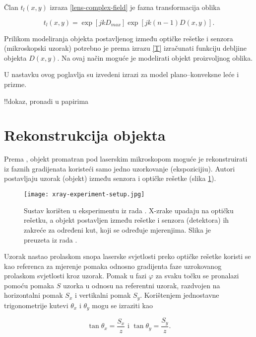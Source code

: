 \documentclass[times, utf8, diplomski, numeric]{fer}
\begin{document}
Član $t_l(x,y)$ izraza \ref{lens-complex-field} je fazna transformacija oblika

\begin{equation}
	\label{T}
	t_l(x,y) = \exp\left[jkD_{max}\right]\exp\left[jk(n - 1)D(x,y)\right].
\end{equation}

Prilikom modeliranja objekta postavljenog između optičke rešetke i senzora (mikroskopski uzorak) potrebno je prema izrazu \ref{T} izračunati funkciju debljine objekta $D(x,y)$. Na ovaj način moguće je modelirati objekt proizvoljnog oblika.

U nastavku ovog poglavlja su izvedeni izrazi za model plano--konveksne leće i prizme. 

!!dokaz, pronadi u papirima


\section{Rekonstrukcija objekta}

Prema \citep{Morgan:11}, objekt promatran pod laserskim mikroskopom moguće je rekonstruirati iz faznih gradijenata koristeći samo jedno uzorkovanje (ekspozicijiu). Autori postavljaju uzorak (objekt) između senzora i optičke rešetke (slika \ref{Morgan:11-xray-experiment}).


\begin{figure}[h]
	\texttt{[image: xray-experiment-setup.jpg]}
	\centering
	\caption{Sustav korišten u eksperimentu iz rada \cite{Morgan:11}. X-zrake upadaju na optičku rešetku, a objekt postavljen između rešetke i senzora (detektora) ih zakreće za određeni kut, koji se određuje mjerenjima. Slika je preuzeta iz rada \cite{Morgan:11}.}
	\label{Morgan:11-xray-experiment}
\end{figure}


Uzorak nastao prolaskom snopa laserske svjetlosti preko optičke rešetke koristi se kao referenca za mjerenje pomaka odnosno gradijenta faze uzrokovanog prolaskom svjetlosti kroz uzorak. 
Pomak u fazi $\varphi$ za svaku točku se pronalazi pomoću pomaka $S$ uzorka u odnosu na referentni uzorak, razdvojen na horizontalni pomak $S_x$ i vertikalni pomak $S_y$. 
Korištenjem jednostavne trigonometrije kutevi $\theta_x$ i $\theta_y$ mogu se izraziti kao

\begin{equation}
	\label{thetas}
	\tan\theta_x = \frac{S_x}{z}  \text{ i } \tan\theta_y = \frac{S_y}{z}.
\end{equation} 
\end{document}
